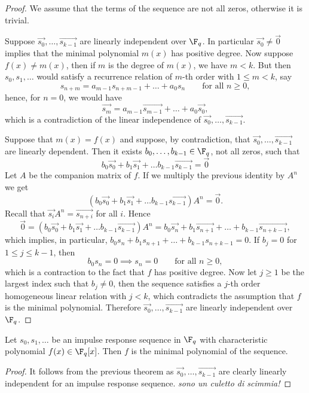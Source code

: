 \begin{proof}
	We assume that the terms of the sequence are not all zeros, otherwise it is trivial.
	
	Suppose \(\vec{s_0},\ldots,\vec{s_{k-1}}\) are linearly independent over \(\F_q\). In particular \(\vec{s_0}\neq \vec{0}\) implies that the minimal polynomial \(m(x)\) has positive degree. Now suppose \(f(x)\neq m(x)\), then if \(m\) is the degree of \(m(x)\), we have \(m<k\). But then \(s_0,s_1,\ldots\) would satisfy a recurrence relation of \(m\)-th order with \(1\le m <k\), say
	\[
		s_{n+m} = a_{m-1}s_{n+m-1}+\ldots+a_0s_n \qquad\text{for all }n \ge 0,
	\]
	hence, for \(n=0\), we would have
	\[
		\vec{s_m} = a_{m-1} \vec{s_{m-1}} + \ldots + a_0 \vec{s_0},
	\]
	which is a contradiction of the linear independence of \(\vec{s_0},\ldots,\vec{s_{k-1}}\).
	
	Suppose that \(m(x)=f(x)\) and suppose, by contradiction, that \(\vec{s_0},\ldots,\vec{s_{k-1}}\) are linearly dependent. Then it exists \(b_0,\ldots,b_{k-1}\in\F_q\), not all zeros, such that
	\[
		b_0\vec{s_0}+b_1\vec{s_1} + \ldots b_{k-1}\vec{s_{k-1}} = \vec{0}
	\]
	Let \(A\) be the companion matrix of \(f\). If we multiply the previous identity by \(A^n\) we get
	\[
		(b_0\vec{s_0}+b_1\vec{s_1} + \ldots b_{k-1}\vec{s_{k-1}})A^n = \vec{0}.
	\]
	Recall that \(\vec{s_i}A^n = \vec{s_{n+i}}\) for all \(i\). Hence
	\[
		\vec{0} = (b_0\vec{s_0}+b_1\vec{s_1} + \ldots b_{k-1}\vec{s_{k-1}})A^n = b_0\vec{s_n} + b_1 \vec{s_{n+1}} + \ldots + b_{k-1}\vec{s_{n+k-1}},
	\]
	which implies, in particular, \(b_0 s_n + b_1 s_{n+1} + \ldots + b_{k-1}s_{n+k-1} = 0\). If \(b_j=0\) for \(1\le j \le k-1\), then
	\[
		b_0 s_n = 0 \implies s_n = 0 \qquad\text{for all }n\ge 0,
	\]
	which is a contraction to the fact that \(f\) has positive degree. Now let \(j\ge 1\) be the largest index such that \(b_j \neq 0\), then the sequence satisfies a \(j\)-th order homogeneous linear relation with \(j<k\), which contradicts the assumption that \(f\) is the minimal polynomial. Therefore \(\vec{s_0},\ldots,\vec{s_{k-1}}\) are linearly independent over \(\F_q\).
\end{proof}

\begin{cor}
	Let \(s_0,s_1,\ldots\) be an impulse response sequence in \(\F_q\) with characteristic polynomial \(f(x)\in\F_q[x]\). Then \(f\) is the minimal polynomial of the sequence.
\end{cor}

\begin{proof}
	It follows from the previous theorem as \(\vec{s_0},\ldots,\vec{s_{k-1}}\) are clearly linearly independent for an impulse response sequence. \emph{sono un culetto di  scimmia!}
\end{proof}

